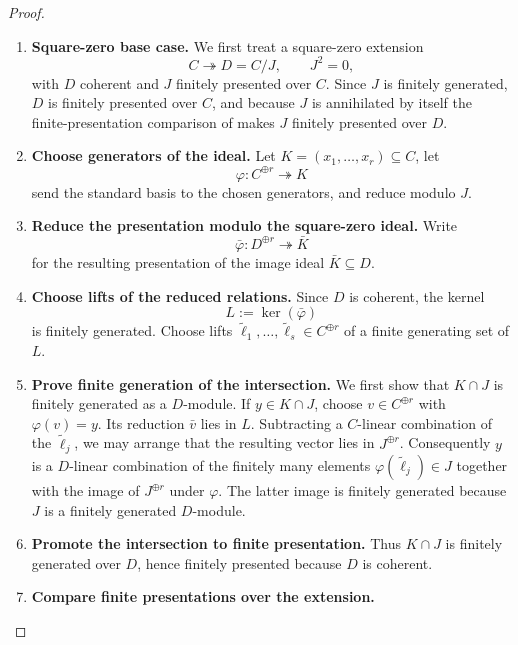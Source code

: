 \begin{proof}
\leavevmode
\begin{enumerate}[label=\textup{(\arabic*)}]
    \item \textbf{Square-zero base case.}
    We first treat a square-zero extension
    \[
        C\twoheadrightarrow D=C/J,
        \qquad J^2=0,
    \]
    with \(D\) coherent and \(J\) finitely presented over \(C\). Since \(J\) is
    finitely generated, \(D\) is finitely presented over \(C\), and because \(J\)
    is annihilated by itself the finite-presentation comparison of
     makes \(J\) finitely
    presented over \(D\).
    \item \textbf{Choose generators of the ideal.}
    Let \(K=(x_1,\ldots,x_r)\subseteq C\), let
    \[
        \varphi:C^{\oplus r}\twoheadrightarrow K
    \]
    send the standard basis to the chosen generators, and reduce modulo \(J\).
    \item \textbf{Reduce the presentation modulo the square-zero ideal.}
    Write
    \[
        \bar\varphi:D^{\oplus r}\twoheadrightarrow\bar K
    \]
    for the resulting presentation of the image ideal \(\bar K\subseteq D\).
    \item \textbf{Choose lifts of the reduced relations.}
    Since \(D\) is coherent, the kernel
    \[
        L:=\ker(\bar\varphi)
    \]
    is finitely generated. Choose lifts
    \(\widetilde\ell_1,\ldots,\widetilde\ell_s\in C^{\oplus r}\) of a finite
    generating set of \(L\).
    \item \textbf{Prove finite generation of the intersection.}
    We first show that \(K\cap J\) is finitely generated as a \(D\)-module.
    If \(y\in K\cap J\), choose \(v\in C^{\oplus r}\) with
    \(\varphi(v)=y\). Its reduction \(\bar v\) lies in \(L\). Subtracting a
    \(C\)-linear combination of the \(\widetilde\ell_j\), we may arrange that
    the resulting vector lies in \(J^{\oplus r}\). Consequently \(y\) is a
    \(D\)-linear combination of the finitely many elements
    \(\varphi(\widetilde\ell_j)\in J\) together with the image of
    \(J^{\oplus r}\) under \(\varphi\). The latter image is finitely generated
    because \(J\) is a finitely generated \(D\)-module.
    \item \textbf{Promote the intersection to finite presentation.}
    Thus \(K\cap J\) is
    finitely generated over \(D\), hence finitely presented because \(D\) is
    coherent.
    \item \textbf{Compare finite presentations over the extension.}

\end{enumerate}
\end{proof}
